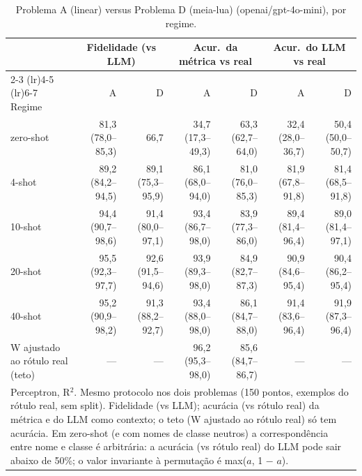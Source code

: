 \begin{table}[htbp]
\centering
\small
\caption{Problema A (linear) versus Problema D (meia-lua) (openai/gpt-4o-mini), por regime.}
\label{tab:bloco1_A_vs_D_por_regime_gpt4mini}
\begin{tabular}{lrrrrrr}
\toprule
 & \multicolumn{2}{c}{Fidelidade (vs LLM)} & \multicolumn{2}{c}{Acur.\ da métrica vs real} & \multicolumn{2}{c}{Acur.\ do LLM vs real} \\ \cmidrule(lr){2-3} \cmidrule(lr){4-5} \cmidrule(lr){6-7}
Regime & A & D & A & D & A & D \\
\midrule
zero-shot & 81,3 (78,0–85,3) & 66,7 & 34,7 (17,3–49,3) & 63,3 (62,7–64,0) & 32,4 (28,0–36,7) & 50,4 (50,0–50,7) \\
4-shot & 89,2 (84,2–94,5) & 89,1 (75,3–95,9) & 86,1 (68,0–94,0) & 81,0 (76,0–85,3) & 81,9 (67,8–91,8) & 81,4 (68,5–91,8) \\
10-shot & 94,4 (90,7–98,6) & 91,4 (80,0–97,1) & 93,4 (86,7–98,0) & 83,9 (77,3–86,0) & 89,4 (81,4–96,4) & 89,0 (81,4–97,1) \\
20-shot & 95,5 (92,3–97,7) & 92,6 (91,5–94,6) & 93,9 (89,3–98,0) & 84,9 (82,7–87,3) & 90,9 (84,6–95,4) & 90,4 (86,2–95,4) \\
40-shot & 95,2 (90,9–98,2) & 91,3 (88,2–92,7) & 93,4 (88,0–98,0) & 86,1 (84,7–88,0) & 91,4 (83,6–96,4) & 91,9 (87,3–96,4) \\
\midrule
W ajustado ao rótulo real (teto) & — & — & 96,2 (95,3–98,0) & 85,6 (84,7–86,7) & — & — \\
\bottomrule
\multicolumn{7}{p{0.95\linewidth}}{\footnotesize Perceptron, R$^2$. Mesmo protocolo nos dois problemas (150 pontos, exemplos do rótulo real, sem split). Fidelidade (vs LLM); acurácia (vs rótulo real) da métrica e do LLM como contexto; o teto (W ajustado ao rótulo real) só tem acurácia. Em zero-shot (e com nomes de classe neutros) a correspondência entre nome e classe é arbitrária: a acurácia (vs rótulo real) do LLM pode sair abaixo de 50\%; o valor invariante à permutação é max($a$, 1 $-$ $a$).} \\
\end{tabular}
\end{table}

